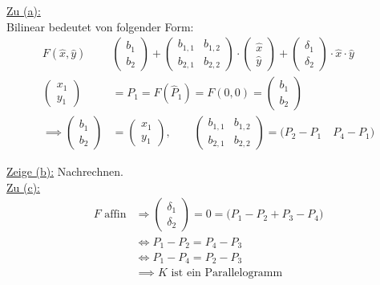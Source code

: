 \documentclass[12pt,a4paper]{article}
\begin{document}
\begin{lösung}
\underline{Zu (a):}\\
Bilinear bedeutet von folgender Form:
\begin{align*}
F(\hat{x},\hat{y})&\begin{pmatrix}
b_1\\ b_2
\end{pmatrix}
+\begin{pmatrix}
b_{1,1} & b_{1,2}\\
b_{2,1} & b_{2,2}
\end{pmatrix}\cdot\begin{pmatrix}
\hat{x}\\\hat{y}
\end{pmatrix}+\begin{pmatrix}
\delta_1\\\delta_2
\end{pmatrix}\cdot\hat{x}\cdot\hat{y}\\
\begin{pmatrix}
x_1\\ y_1
\end{pmatrix}
&=P_1=F(\hat{P}_1)=F(0,0)=\begin{pmatrix}
b_1\\ b_2
\end{pmatrix}\\
\implies
\begin{pmatrix}
b_1\\ b_2
\end{pmatrix}&=
\begin{pmatrix}
x_1\\ y_1
\end{pmatrix},\qquad\begin{pmatrix}
b_{1,1} & b_{1,2}\\
b_{2,1} & b_{2,2}
\end{pmatrix}=\Big ( P_2-P_1\quad P_4-P_1  \Big )
\end{align*}

\underline{Zeige (b):} Nachrechnen.\\

\underline{Zu (c):}
\begin{align*}
F\text{ affin}&\Longrightarrow\begin{pmatrix}
\delta_1\\\delta_2
\end{pmatrix}=0=\Big (P_1-P_2+P_3-P_4\Big )\\
&\Longleftrightarrow P_1-P_2=P_4-P_3\\
&\Longleftrightarrow P_1-P_4=P_2-P_3\\
&\implies K\text{ ist ein Parallelogramm}
\end{align*}
\end{lösung}
\end{document}
